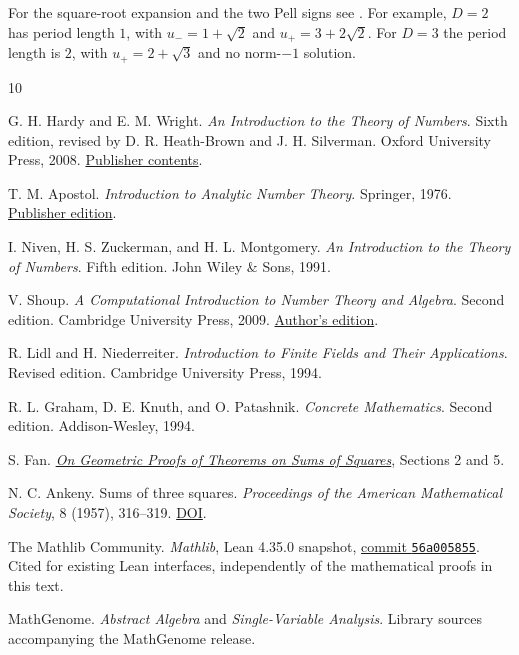 \documentclass[11pt,oneside,openany]{book}
\theoremstyle{plain}
\theoremstyle{definition}
\theoremstyle{remark}
\begin{document}
For the square-root expansion and the two Pell signs see
\cite[Sections 7.7--7.8, Theorems 7.21--7.26]{nzm}.
For example, \(D=2\) has period length \(1\), with \(u_-=1+\sqrt2\)
and \(u_+=3+2\sqrt2\). For \(D=3\) the period length is \(2\),
with \(u_+=2+\sqrt3\) and no norm-\(-1\) solution.

\backmatter
\begin{thebibliography}{10}

G. H. Hardy and E. M. Wright.
\emph{An Introduction to the Theory of Numbers}.
Sixth edition, revised by D. R. Heath-Brown and J. H. Silverman.
Oxford University Press, 2008.
\href{https://academic.oup.com/book/54489}{Publisher contents}.

T. M. Apostol.
\emph{Introduction to Analytic Number Theory}.
Springer, 1976.
\href{https://doi.org/10.1007/978-1-4757-5579-4}{Publisher edition}.

I. Niven, H. S. Zuckerman, and H. L. Montgomery.
\emph{An Introduction to the Theory of Numbers}.
Fifth edition. John Wiley \& Sons, 1991.

V. Shoup.
\emph{A Computational Introduction to Number Theory and Algebra}.
Second edition. Cambridge University Press, 2009.
\href{https://www.shoup.net/ntb/}{Author's edition}.

R. Lidl and H. Niederreiter.
\emph{Introduction to Finite Fields and Their Applications}.
Revised edition. Cambridge University Press, 1994.

R. L. Graham, D. E. Knuth, and O. Patashnik.
\emph{Concrete Mathematics}.
Second edition. Addison-Wesley, 1994.

S. Fan.
\href{https://math.dartmouth.edu/~stevefan/papers/On\%20Geometric\%20Proofs\%20of\%20Theorems\%20on\%20Sums\%20of\%20Squares.pdf}
{\emph{On Geometric Proofs of Theorems on Sums of Squares}},
Sections 2 and 5.

N. C. Ankeny.
Sums of three squares.
\emph{Proceedings of the American Mathematical Society}, 8 (1957), 316--319.
\href{https://doi.org/10.1090/S0002-9939-1957-0085275-8}{DOI}.

The Mathlib Community.
\emph{Mathlib}, Lean 4.35.0 snapshot,
\href{https://github.com/leanprover-community/mathlib4/tree/56a005855ea17e0b0958f73ec801ae140b0a1679}{commit \texttt{56a005855}}.
Cited for existing Lean interfaces, independently of the mathematical
proofs in this text.

MathGenome.
\emph{Abstract Algebra} and \emph{Single-Variable Analysis}.
Library sources accompanying the MathGenome release.

\end{thebibliography}
\end{document}

